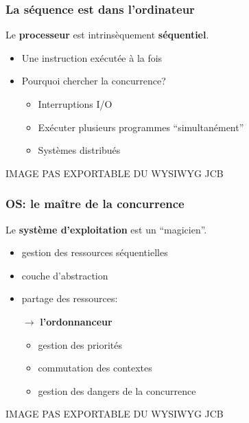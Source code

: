\documentclass{beamer}
\begin{document}
\begin{frame}
  \frametitle{La séquence est dans l'ordinateur}
  Le \textbf{processeur} est intrinsèquement \textbf{séquentiel}.
  \begin{minipage}{.5\linewidth}
    \begin{itemize}
    \item Une instruction exécutée à la fois
    \item Pourquoi chercher la concurrence?
      \begin{itemize}
      \item Interruptions I/O
      \item Exécuter plusieurs programmes ``simultanément''
      \item Systèmes distribués
      \end{itemize}
    \end{itemize}
  \end{minipage}
  \begin{minipage}{.5\linewidth}
    IMAGE PAS EXPORTABLE DU WYSIWYG JCB
  \end{minipage}
\end{frame}
\begin{frame}
  \frametitle{OS: le maître de la concurrence}
  Le \textbf{système d'exploitation} est un ``magicien''.
  \begin{minipage}{.5\linewidth}
    \begin{itemize}
    \item gestion des ressources séquentielles
    \item couche d'abstraction
    \item partage des ressources:\par
      $\rightarrow$ \textbf{l'ordonnanceur}
      \begin{itemize}
      \item gestion des priorités
      \item commutation des contextes
      \item gestion des dangers de la concurrence
      \end{itemize}
    \end{itemize}
  \end{minipage}
  \begin{minipage}{.5\linewidth}
    IMAGE PAS EXPORTABLE DU WYSIWYG JCB    
  \end{minipage}
\end{frame}
\end{document}
